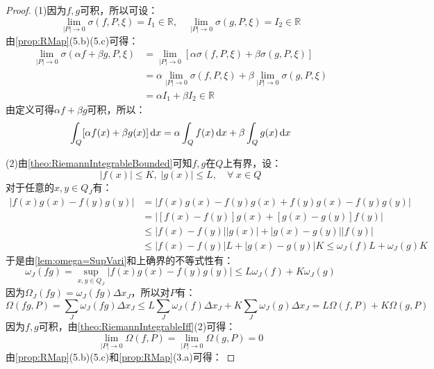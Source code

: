 \begin{proof}
	(1)因为$f,g$可积，所以可设：
	\begin{equation*}
		\lim_{|P|\to0}\sigma(f,P,\xi)=I_1\in\mathbb{R},\quad\lim_{|P|\to0}\sigma(g,P,\xi)=I_2\in\mathbb{R}
	\end{equation*}
	由\cref{prop:RMap}(5.b)(5.c)可得：
	\begin{align*}
		\lim_{|P|\to0}\sigma(\alpha f+\beta g,P,\xi)&=\lim_{|P|\to0}[\alpha\sigma(f,P,\xi)+\beta\sigma(g,P,\xi)] \\
		&=\alpha\lim_{|P|\to0}\sigma(f,P,\xi)+\beta\lim_{|P|\to0}\sigma(g,P,\xi) \\
		&=\alpha I_1+\beta I_2\in\mathbb{R}
	\end{align*}
	由定义可得$\alpha f+\beta g$可积，所以：
	\begin{equation*}
		\int_Q[\alpha f(x)+\beta g(x)]\mathop{}\!\mathrm{d} x=\alpha\int_Qf(x)\mathop{}\!\mathrm{d} x+\beta\int_Qg(x)\mathop{}\!\mathrm{d} x
	\end{equation*}\par
	(2)由\cref{theo:RiemannIntegrableBounded}可知$f,g$在$Q$上有界，设：
	\begin{equation*}
		|f(x)|\leqslant K,\;|g(x)|\leqslant L,\quad\forall\;x\in Q
	\end{equation*}
	对于任意的$x,y\in Q_J$有：
	\begin{align*}
		|f(x)g(x)-f(y)g(y)|&=|f(x)g(x)-f(y)g(x)+f(y)g(x)-f(y)g(y)| \\
		&=|[f(x)-f(y)]g(x)+[g(x)-g(y)]f(y)| \\
		&\leqslant|f(x)-f(y)||g(x)|+|g(x)-g(y)||f(y)| \\
		&\leqslant|f(x)-f(y)|L+|g(x)-g(y)|K\leqslant\omega_J(f)L+\omega_J(g)K
	\end{align*}
	于是由\cref{lem:omega=SupVari}和上确界的不等式性有：
	\begin{equation*}
		\omega_J(fg)=\sup_{x,y\in Q_J}|f(x)g(x)-f(y)g(y)|\leqslant L\omega_J(f)+K\omega_J(g)
	\end{equation*}
	因为$\Omega_J(fg)=\omega_J(fg)\Delta x_J$，所以对$P$有：
	\begin{equation*}
		\Omega(fg,P)=\sum_{J}\omega_J(fg)\Delta x_J\leqslant L\sum_{J}\omega_J(f)\Delta x_J+K\sum_{J}\omega_J(g)\Delta x_J=L\Omega(f,P)+K\Omega(g,P)
	\end{equation*}
	因为$f,g$可积，由\cref{theo:RiemannIntegrableIff}(2)可得：
	\begin{equation*}
		\lim_{|P|\to0}\Omega(f,P)=\lim_{|P|\to0}\Omega(g,P)=0
	\end{equation*}
	由\cref{prop:RMap}(5.b)(5.c)和\cref{prop:RMap}(3.a)可得：

\end{proof}
